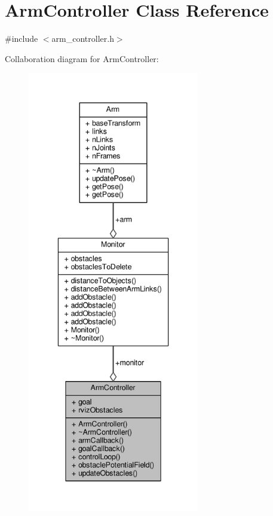 \hypertarget{class_arm_controller}{}\section{Arm\+Controller Class Reference}
\label{class_arm_controller}


{\ttfamily \#include $<$arm\+\_\+controller.\+h$>$}



Collaboration diagram for Arm\+Controller\+:
\nopagebreak
\begin{figure}[H]
\begin{center}
\leavevmode
\includegraphics[height=550pt]{class_arm_controller__coll__graph}
\end{center}
\end{figure}
